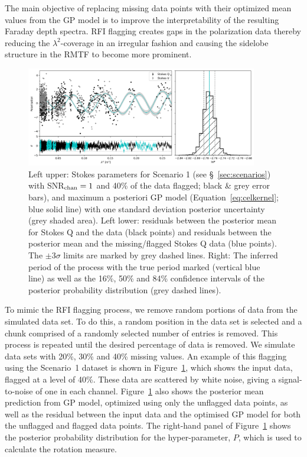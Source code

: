 \documentclass[fleqn,usenatbib]{mnras}
\begin{document}
The main objective of replacing missing data points with their optimized mean values from the GP model is to improve the interpretability of the resulting Faraday depth spectra. RFI flagging creates gaps in the polarization data thereby reducing the $\lambda^{2}$-coverage in an irregular fashion and causing the sidelobe structure in the RMTF to become more prominent.
%
\begin{figure}
\includegraphics[width=0.9\textwidth]{./FIGURES/diff_case1_minus40_n1.png}
\caption{\label{fig:scenario1} Left upper: Stokes parameters for Scenario 1 (see \S~\ref{sec:scenarios}) with SNR$_{\rm chan}=1$ and 40\% of the data flagged; black \& grey error bars), and maximum a posteriori GP model (Equation~\ref{eq:celkernel}; blue solid line) with one standard deviation posterior uncertainty (grey shaded area). Left lower: residuals between the posterior mean for Stokes Q and the data (black points) and residuals between the posterior mean and the missing/flagged Stokes Q data (blue points). The $\pm3\sigma$ limits are marked by grey dashed lines. Right: The inferred period of the process with the true period marked (vertical blue line) as well as the 16\%, 50\% and 84\% confidence intervals of the posterior probability distribution (grey dashed lines).}
\end{figure}

To mimic the RFI flagging process, we remove random portions of data from the simulated data set. To do this, a random position in the data set is selected and a chunk comprised of a randomly selected number of entries is removed. This process is repeated until the desired percentage of data is removed. We simulate data sets with 20\%, 30\% and 40\% missing values. An example of this flagging using the Scenario~1 dataset is shown in Figure~\ref{fig:scenario1}, which shows the input data, flagged at a level of 40\%. These data are scattered by white noise, giving a signal-to-noise of one in each channel. Figure~\ref{fig:scenario1} also shows the posterior mean prediction from GP model, optimized using only the unflagged data points, as well as the residual between the input data and the optimised GP model for both the unflagged and flagged data points. The right-hand panel of Figure~\ref{fig:scenario1} shows the posterior probability distribution for the hyper-parameter, $P$, which is used to calculate the rotation measure. 
\end{document}
